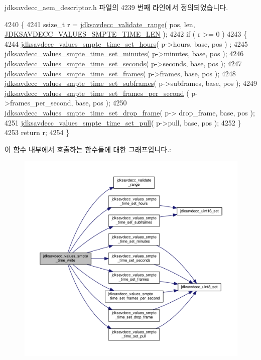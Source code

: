 jdksavdecc\+\_\+aem\+\_\+descriptor.\+h 파일의 4239 번째 라인에서 정의되었습니다.


\begin{DoxyCode}
4240 \{
4241     ssize\_t r = \hyperlink{group__util_ga9c02bdfe76c69163647c3196db7a73a1}{jdksavdecc\_validate\_range}( pos, len, 
      \hyperlink{group__values__smpte__time_ga479451e2d80f4c927b20ef6007ff18d7}{JDKSAVDECC\_VALUES\_SMPTE\_TIME\_LEN} );
4242     \textcolor{keywordflow}{if} ( r >= 0 )
4243     \{
4244         \hyperlink{group__values__smpte__time_ga252c1a63bc857bbebce3ad36259db5cb}{jdksavdecc\_values\_smpte\_time\_set\_hours}( p->hours, base, pos )
      ;
4245         \hyperlink{group__values__smpte__time_ga22a43a5204eccef862c262f66675df66}{jdksavdecc\_values\_smpte\_time\_set\_minutes}( p->minutes, base,
       pos );
4246         \hyperlink{group__values__smpte__time_ga72b70e0e870366b9e2ddd5a5c1b7af79}{jdksavdecc\_values\_smpte\_time\_set\_seconds}( p->seconds, base,
       pos );
4247         \hyperlink{group__values__smpte__time_gae400a4fe95507407d977aa0f4124b07a}{jdksavdecc\_values\_smpte\_time\_set\_frames}( p->frames, base, 
      pos );
4248         \hyperlink{group__values__smpte__time_gad39c0f512e6fab29e4f9097b02a2b550}{jdksavdecc\_values\_smpte\_time\_set\_subframes}( p->subframes,
       base, pos );
4249         \hyperlink{group__values__smpte__time_ga6825a8ea3f44e1075798d3143f09259e}{jdksavdecc\_values\_smpte\_time\_set\_frames\_per\_second}
      ( p->frames\_per\_second, base, pos );
4250         \hyperlink{group__values__smpte__time_ga8bfb6a85ec5b376406dadef0ae08d5bd}{jdksavdecc\_values\_smpte\_time\_set\_drop\_frame}( p->
      drop\_frame, base, pos );
4251         \hyperlink{group__values__smpte__time_ga1e043d9c7b57f14e800a926e9a516f34}{jdksavdecc\_values\_smpte\_time\_set\_pull}( p->pull, base, pos );
4252     \}
4253     \textcolor{keywordflow}{return} r;
4254 \}
\end{DoxyCode}


이 함수 내부에서 호출하는 함수들에 대한 그래프입니다.\+:
\nopagebreak
\begin{figure}[H]
\begin{center}
\leavevmode
\includegraphics[width=350pt]{group__values__smpte__time_gae9dd6a95d19fe06811b02b4f19ef41aa_cgraph}
\end{center}
\end{figure}


